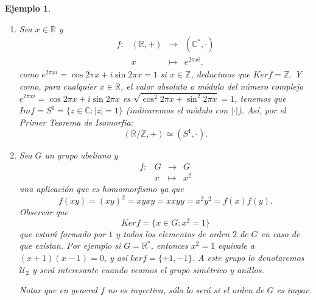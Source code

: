 \documentclass[12pt]{article}
\newtheorem{example}{Ejemplo}[theorem]
\begin{document}
\begin{example}
\begin{enumerate}
cumple $det A = a1^{n-1} = a$, probando la sobreyectividad de $f$.
\item Sea $x \in \mathbb{R}$ y  $$\begin{array}{rccl}
f\colon &(\mathbb{R}, +) & \longrightarrow & (\mathbb{C}^{\ast}, \cdot)\\
&x& \longmapsto &e^{2\pi xi},
\end{array}
$$ como $e^{2\pi xi} = \cos 2\pi x + i\sin 2\pi x = 1$ si $x \in \mathbb{Z}$, deducimos que $Ker f = \mathbb{Z}$. Y como, para cualquier $x \in \mathbb{R}$, el valor absoluto o \textit{módulo} del número complejo $e^{2\pi x i} = \cos 2\pi x + i\sin 2\pi x$ es $\sqrt{\cos^{2} 2 \pi x +\sin^{2} 2\pi x} = 1$, tenemos que $Im f = S^{1} = \lbrace z \in \mathbb{C}: |z| = 1\rbrace$ (indicaremos el módulo con $|\cdot |$). Así, por el \textit{Primer Teorema de Isomorfía}: $$(\mathbb{R}/\mathbb{Z},+) \simeq (S^{1}, \cdot).$$
\item Sea $G$ un grupo abeliano y $$\begin{array}{rccl}
f\colon &G & \longrightarrow & G\\
&x& \longmapsto &x^{2}
\end{array}
$$ una aplicación que es homomorfismo ya que $$f(xy) = (xy)^{2} = xyxy = xxyy = x^{2}y^{2} = f(x)f(y).$$
Observar que $$Ker f = \lbrace x \in G : x^{2} = 1\rbrace$$ que estará formado por $1$ y todos los elementos de orden $2$ de $G$ en caso de que existan. Por ejemplo si $G = \mathbb{R}^{\ast}$, entonces $x^{2} = 1$ equivale a $(x+1)(x-1) = 0$, y así $ker f = \lbrace +1,-1\rbrace$. A este grupo lo denotaremos $\mathcal{U}_{2}$ y será interesante cuando veamos el \textit{grupo simétrico} y anillos.

Notar que en general $f$ no es inyectiva, sólo lo será si el orden de $G$ es impar.


\end{enumerate}
\end{example}
\end{document}
